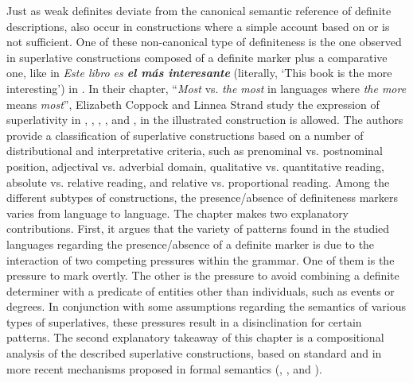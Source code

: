 \documentclass[output=paper]{langsci/langscibook}
\begin{document}
Just as weak definites deviate from the canonical semantic reference of definite descriptions,  also occur in constructions where a simple account based on  or  is not sufficient. One of these non-canonical type of definiteness is the one observed in superlative constructions composed of a definite marker plus a comparative one, like in \textit{Este libro es \textbf{el más interesante}} (literally, ‘This book is the more interesting’) in . In their chapter, “\textit{Most} vs. \textit{the most} in languages where \textit{the more} means \textit{most}”, Elizabeth Coppock and Linnea Strand study the expression of superlativity in , , , , and , in the illustrated construction is allowed. The authors provide a classification of superlative constructions based on a number of distributional and interpretative criteria, such as prenominal vs. postnominal position, adjectival vs. adverbial domain, qualitative vs. quantitative reading, absolute vs. relative reading, and relative vs. proportional reading. Among the different subtypes of constructions, the presence/absence of definiteness markers varies from language to language. The chapter makes two explanatory contributions. First, it argues that the variety of patterns found in the studied languages regarding the presence/absence of a definite marker is due to the interaction of two competing pressures within the grammar. One of them is the pressure to mark  overtly. The other is the pressure to avoid combining a definite determiner with a predicate of entities other than individuals, such as events or degrees. In conjunction with some assumptions regarding the semantics of various types of superlatives, these pressures result in a disinclination for certain patterns. The second explanatory takeaway of this chapter is a compositional analysis of the described superlative constructions, based on standard and in more recent mechanisms proposed in formal semantics (, , and ).
\end{document}
